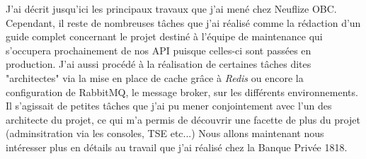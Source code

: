 	J'ai décrit jusqu'ici les principaux travaux que j'ai mené chez Neuflize OBC. Cependant, il reste de nombreuses tâches que j'ai réalisé comme la rédaction d'un guide complet concernant le projet destiné à l'équipe de maintenance qui s'occupera prochainement de nos API puisque celles-ci sont passées en production. J'ai aussi procédé à la réalisation de certaines tâches dites "architectes" via la mise en place de cache grâce à \textit{Redis} ou encore la configuration de RabbitMQ, le message broker, sur les différents environnements. Il s'agissait de petites tâches que j'ai pu mener conjointement avec l'un des architecte du projet, ce qui m'a permis de découvrir une facette de plus du projet (adminsitration via les consoles, TSE etc...) Nous allons maintenant nous intéresser plus en détails au travail que j'ai réalisé chez la Banque Privée 1818.